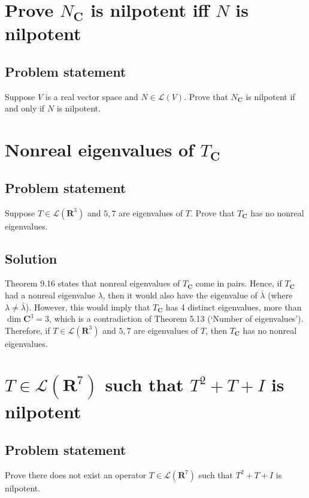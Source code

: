 \documentclass{article}
\begin{document}
\clearpage

\section{Prove $N_{\mathbf{C}}$ is nilpotent iff $N$ is nilpotent}
\subsection*{Problem statement}
Suppose $V$ is a real vector space and $N\in\mathcal{L}(V)$. Prove that $N_{\mathbf{C}}$ is nilpotent if and only if $N$ is nilpotent.

\clearpage

\section{Nonreal eigenvalues of $T_{\mathbf{C}}$}
\subsection*{Problem statement}
Suppose $T\in\mathcal{L}(\mathbf{R}^3)$ and $5,7$ are eigenvalues of $T$. Prove that $T_{\mathbf{C}}$ has no nonreal eigenvalues.

\subsection*{Solution}
Theorem 9.16 states that nonreal eigenvalues of $T_{\mathbf{C}}$ come in pairs. 
Hence, if $T_{\mathbf{C}}$ had a nonreal eigenvalue $\lambda$, then it would also have the eigenvalue of $\bar{\lambda}$ (where $\lambda\neq\bar{\lambda}$). 
However, this would imply that $T_{\mathbf{C}}$ has 4 distinct eigenvalues, more than $\operatorname{dim}\mathbf{C}^3=3$, which is a contradiction of Theorem 5.13 (`Number of eigenvalues'). 
Therefore, if $T\in\mathcal{L}(\mathbf{R}^3)$ and $5,7$ are eigenvalues of $T$, then $T_{\mathbf{C}}$ has no nonreal eigenvalues.

\clearpage

\section{$T\in\mathcal{L}(\mathbf{R}^7)$ such that $T^2+T+I$ is nilpotent}
\subsection*{Problem statement}
Prove there does not exist an operator $T\in\mathcal{L}(\mathbf{R}^7)$ such that $T^2+T+I$ is nilpotent.
\end{document}
